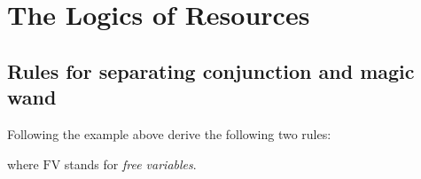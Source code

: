 \section{The Logics of Resources}

\setcounter{subsection}{1}
\subsection{Rules for separating conjunction and magic wand}

\setcounter{exercise}{1}
\begin{exercise}
Following the example above derive the following two rules:
where $\mathrm{FV}$ stands for \textit{free variables}.
\end{exercise}

